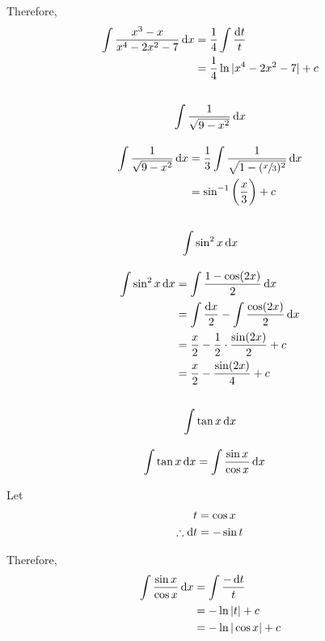 \documentclass[fleqn, a4paper]{article}
\begin{document}
Therefore,
\begin{align*}
	\int \dfrac{x^3 - x}{x^4 - 2x^2 - 7} \dif x &= \dfrac{1}{4} \int \dfrac{\dif t}{t}\\
	&= \dfrac{1}{4} \ln |x^4 - 2x^2 - 7| + c
\end{align*}

\subsection{\[\int \dfrac{1}{\sqrt{9 - x^2}} \dif x\]}

\begin{align*}
	\int \dfrac{1}{\sqrt{9 - x^2}} \dif x &= \dfrac{1}{3} \int \dfrac{1}{\sqrt{1 - (\sfrac{x}{3})^2}} \dif x\\
	&= \sin^{-1} \left( \dfrac{x}{3} \right) + c
\end{align*}

\subsection{\[\int \sin^2 x \dif x\]}

\begin{align*}
	\int \sin^2 x \dif x &= \int \dfrac{1 - \cos(2x)}{2} \dif x\\
	&= \int \dfrac{\dif x}{2} - \int \dfrac{\cos(2x)}{2} \dif x\\
	&= \dfrac{x}{2} - \dfrac{1}{2} \cdot \dfrac{\sin(2x)}{2} + c\\
	&= \dfrac{x}{2} - \dfrac{\sin(2x)}{4} + c
\end{align*}

\subsection{\[\int \tan x \dif x\]}

\begin{align*}
	\int \tan x \dif x &= \int \dfrac{\sin x}{\cos x} \dif x
\end{align*}

Let
\begin{align*}
	t &= \cos x\\
	\therefore \dif t &= -\sin t
\end{align*}

Therefore,
\begin{align*}
	\int \dfrac{\sin x}{\cos x} \dif x &= \int \dfrac{- \dif t}{t}\\
	&= - \ln |t| + c\\
	&= - \ln |\cos x| + c
\end{align*}
\end{document}
